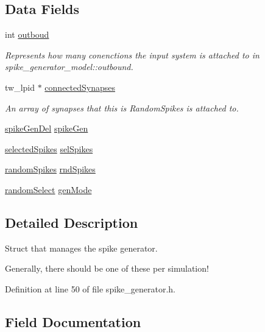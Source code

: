 \subsection*{Data Fields}
\begin{DoxyCompactItemize}
\item 
int \hyperlink{structspike_gen_state_aec7144375204d70824626d74677d71ce}{outboud}
\begin{DoxyCompactList}\small\item\em Represents how many conenctions the input system is attached to in spike\+\_\+generator\+\_\+model\+::outbound. \end{DoxyCompactList}\item 
tw\+\_\+lpid $\ast$ \hyperlink{structspike_gen_state_a569dc67b8984bb0a3616bf17f9763ebb}{connected\+Synapses}
\begin{DoxyCompactList}\small\item\em An array of synapses that this is Random\+Spikes is attached to. \end{DoxyCompactList}\item 
\hyperlink{spike__generator_8h_aa47e87d309aab7727810011578bae86e}{spike\+Gen\+Del} \hyperlink{structspike_gen_state_ae40f21a48f3157bcad074f424046ed2c}{spike\+Gen}
\item 
\hyperlink{structselected_spikes}{selected\+Spikes} \hyperlink{structspike_gen_state_a2da60d116861755bbeeb531a01124cb0}{sel\+Spikes}
\item 
\hyperlink{structrandom_spikes}{random\+Spikes} \hyperlink{structspike_gen_state_a57768e1ceaa4dd88752232ad89b4e8b7}{rnd\+Spikes}
\item 
\hyperlink{spike__generator_8h_ad05574e5624d82eeb7acf436ba8802f6}{random\+Select} \hyperlink{structspike_gen_state_a79f1111d8527d3ef966593c8d389f34d}{gen\+Mode}
\end{DoxyCompactItemize}


\subsection{Detailed Description}
Struct that manages the spike generator. 

Generally, there should be one of these per simulation! 

Definition at line 50 of file spike\+\_\+generator.\+h.



\subsection{Field Documentation}
\hypertarget{structspike_gen_state_a569dc67b8984bb0a3616bf17f9763ebb}{}
